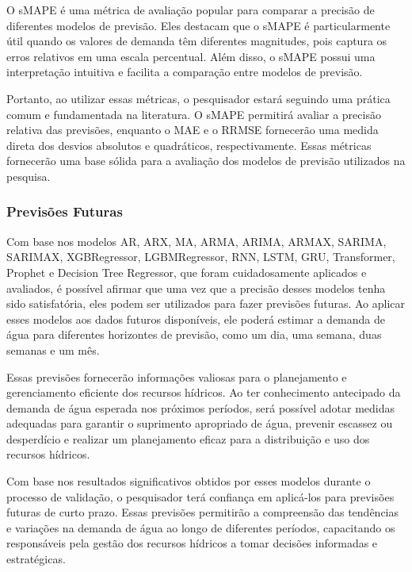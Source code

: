 \begin{quoting}[rightmargin=0cm,leftmargin=4cm]
	\begin{singlespace}
		{\footnotesize \noindent O sMAPE é uma métrica de avaliação popular para comparar a precisão de diferentes modelos de previsão. Eles destacam que o sMAPE é particularmente útil quando os valores de demanda têm diferentes magnitudes, pois captura os erros relativos em uma escala percentual. Além disso, o sMAPE possui uma interpretação intuitiva e facilita a comparação entre modelos de previsão. \cite{hyndman2006effect}
}
	\end{singlespace}
\end{quoting}


Portanto, ao utilizar essas métricas, o pesquisador estará seguindo uma prática comum e fundamentada na literatura. O sMAPE permitirá avaliar a precisão relativa das previsões, enquanto o MAE e o RRMSE fornecerão uma medida direta dos desvios absolutos e quadráticos, respectivamente. Essas métricas fornecerão uma base sólida para a avaliação dos modelos de previsão utilizados na pesquisa.


\subsubsection{Previs\~oes Futuras}


Com base nos modelos AR, ARX, MA, ARMA, ARIMA, ARMAX, SARIMA, SARIMAX,  XGBRegressor, LGBMRegressor, RNN, LSTM, GRU, Transformer, Prophet e Decision Tree Regressor, que foram cuidadosamente aplicados e avaliados, é possível afirmar que uma vez que a precisão desses modelos tenha sido satisfatória, eles podem ser utilizados para fazer previsões futuras. Ao aplicar esses modelos aos dados futuros disponíveis, ele poderá estimar a demanda de água para diferentes horizontes de previsão, como um dia, uma semana, duas semanas e um mês.

Essas previsões fornecerão informações valiosas para o planejamento e gerenciamento eficiente dos recursos hídricos. Ao ter conhecimento antecipado da demanda de água esperada nos próximos períodos, será possível adotar medidas adequadas para garantir o suprimento apropriado de água, prevenir escassez ou desperdício e realizar um planejamento eficaz para a distribuição e uso dos recursos hídricos.

Com base nos resultados significativos obtidos por esses modelos durante o processo de validação, o pesquisador terá confiança em aplicá-los para previsões futuras de curto prazo. Essas previsões permitirão a compreensão das tendências e variações na demanda de água ao longo de diferentes períodos, capacitando os responsáveis pela gestão dos recursos hídricos a tomar decisões informadas e estratégicas.

